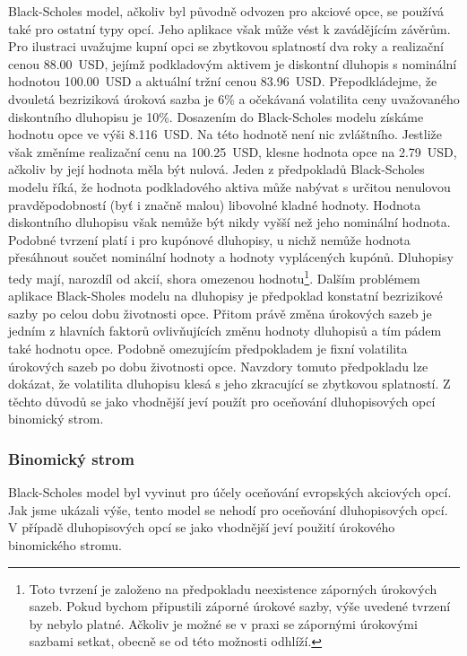 \documentclass[a4paper]{book}
\begin{document}
Black-Scholes model, ačkoliv byl původně odvozen pro akciové opce, se používá také pro ostatní typy opcí. Jeho aplikace však může vést k zavádějícím závěrům. Pro ilustraci uvažujme kupní opci se zbytkovou splatností dva roky a realizační cenou 88.00~USD, jejímž podkladovým aktivem je diskontní dluhopis s nominální hodnotou 100.00~USD a aktuální tržní cenou 83.96~USD. Přepodkládejme, že dvouletá bezriziková úroková sazba je 6\% a očekávaná volatilita ceny uvažovaného diskontního dluhopisu je 10\%. Dosazením do Black-Scholes modelu získáme hodnotu opce ve výši 8.116~USD. Na této hodnotě není nic zvláštního. Jestliže však změníme realizační cenu na 100.25~USD, klesne hodnota opce na 2.79~USD, ačkoliv by její hodnota měla být nulová. Jeden z předpokladů Black-Scholes modelu říká, že hodnota podkladového aktiva může nabývat s určitou nenulovou pravděpodobností (byť i značně malou) libovolné kladné hodnoty. Hodnota diskontního dluhopisu však nemůže být nikdy vyšší než jeho nominální hodnota. Podobné tvrzení platí i pro kupónové dluhopisy, u nichž nemůže hodnota přesáhnout součet nominální hodnoty a hodnoty vyplácených kupónů. Dluhopisy tedy mají, narozdíl od akcií, shora omezenou hodnotu\footnote{Toto tvrzení je založeno na předpokladu neexistence záporných úrokových sazeb. Pokud bychom připustili záporné úrokové sazby, výše uvedené tvrzení by nebylo platné. Ačkoliv je možné se v praxi se zápornými úrokovými sazbami setkat, obecně se od této možnosti odhlíží.}. Dalším problémem aplikace Black-Sholes modelu na dluhopisy je předpoklad konstatní bezrizikové sazby po celou dobu životnosti opce. Přitom právě změna úrokových sazeb je jedním z hlavních faktorů ovlivňujících změnu hodnoty dluhopisů a tím pádem také hodnotu opce. Podobně omezujícím předpokladem je fixní volatilita úrokových sazeb po dobu životnosti opce. Navzdory tomuto předpokladu lze dokázat, že volatilita dluhopisu klesá s jeho zkracující se zbytkovou splatností. Z těchto důvodů se jako vhodnější jeví použít pro oceňování dluhopisových opcí binomický strom.

\subsubsection{Binomický strom}

Black-Scholes model byl vyvinut pro účely oceňování evropských akciových opcí. Jak jsme ukázali výše, tento model se nehodí pro oceňování dluhopisových opcí. V případě dluhopisových opcí se jako vhodnější jeví použití úrokového binomického stromu.
\end{document}
